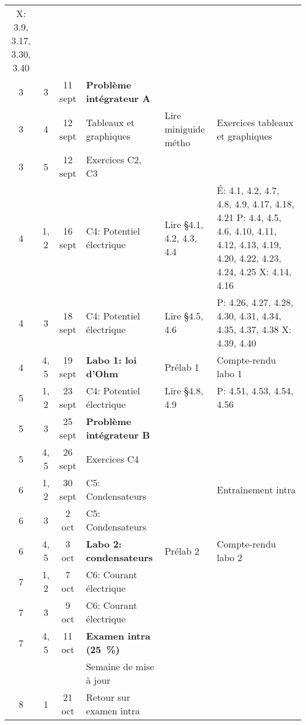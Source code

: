 \documentclass[10pt]{article}
\begin{document}
\begin{longtable}{cccp{6cm}lp{9cm}}
       X: 3.9, 3.17, 3.30, 3.40 \\
  3     &  3     &  11 sept  &  \textbf{Problème intégrateur A}  \\
  3     &  4     &  12 sept   &  Tableaux et graphiques
    & Lire miniguide métho
    & Exercices tableaux et graphiques  \\
  3     &  5     &  12 sept   &  Exercices C2, C3  \\
  \midrule
  4     &  1, 2  &  16 sept   &  C4: Potentiel électrique
    & Lire \S 4.1, 4.2, 4.3, 4.4
    & É: 4.1, 4.2, 4.7, 4.8, 4.9, 4.17, 4.18, 4.21  \newline 
      P: 4.4, 4.5, 4.6, 4.10, 4.11, 4.12, 4.13, 4.19, 4.20, 4.22, 4.23, 4.24, 4.25 \newline 
      X: 4.14, 4.16 \newline \\
  4     &  3     &  18 sept   &  C4: Potentiel électrique
    & Lire \S 4.5, 4.6
    & P: 4.26, 4.27, 4.28, 4.30, 4.31, 4.34, 4.35, 4.37, 4.38 \newline
      X: 4.39, 4.40 \\
  4     &  4, 5  &  19 sept   &  \textbf{Labo 1: loi d'Ohm}
    &  Prélab 1  &  Compte-rendu labo 1 \\
  \midrule
  5     &  1, 2  &  23 sept  &  C4: Potentiel électrique
    & Lire \S 4.8, 4.9
    & P: 4.51, 4.53, 4.54, 4.56  \\
  5     &  3     &  25 sept  &  \textbf{Problème intégrateur B}  \\
  5     &  4, 5  &  26 sept  &  Exercices C4
    &    &   \\
  \midrule
  6     &  1, 2  &  30 sept  &  C5: Condensateurs
    &  &  Entraînement intra  \\
  6     &  3     &  2 oct    &  C5: Condensateurs  \\
  6     &  4, 5  &  3 oct    &  \textbf{Labo 2: condensateurs}
    &  Prélab 2  &  Compte-rendu labo 2 \\
  \midrule
  7     &  1, 2  &  7 oct    &  C6: Courant électrique  \\
  7     &  3     &  9 oct    &  C6: Courant électrique  \\
  7     &  4, 5  &  11 oct   &  \textbf{Examen intra (\qty{25}{\percent})}
    &    &   \\
  \midrule
        &        &           &  Semaine de mise à jour  \\
  \midrule
  8     &  1     &  21 oct   &  Retour sur examen intra  \\

\end{longtable}
\end{document}
